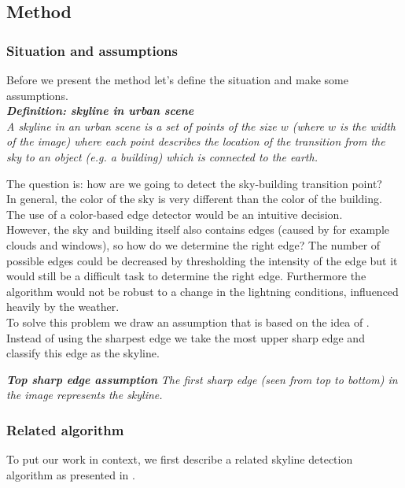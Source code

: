 \subsection{Method} %
\subsubsection{Situation and assumptions}
Before we present the method let's define the situation and make some
assumptions.\\

\textbf{\emph{Definition: skyline in urban scene}}\\
\emph{A skyline in an urban scene is a set of points of the size $w$ (where $w$ is the
width of the image) where each point describes the location of the
transition from the sky to an object (e.g. a building) which is connected to the
earth.}

The question is: how are we going to detect the sky-building
transition point?\\ 
In general, the color of the sky is very different than the
color of the building. The use of a color-based edge detector would be an
intuitive decision.\\
However, the sky and building itself also contains edges (caused by for example
clouds and windows), so how do we determine the right edge?
The number of possible edges could be decreased by thresholding the intensity of
the edge but it would still be a difficult task to determine the right edge.
Furthermore the algorithm would not be robust to a change in
the lightning conditions, influenced heavily by the weather.\\

To solve this problem we draw an assumption that is based on the
idea of \cite{Rover}. Instead of using the sharpest edge we take the most upper sharp
edge and classify this edge as the skyline.

\textbf{\emph{Top sharp edge assumption}}
\emph{The first sharp edge (seen from top to bottom) in the image 
represents the skyline.}




\subsubsection{Related algorithm}
To put our work in context, we first describe a related skyline detection algorithm as presented in \cite{Rover}.\\

